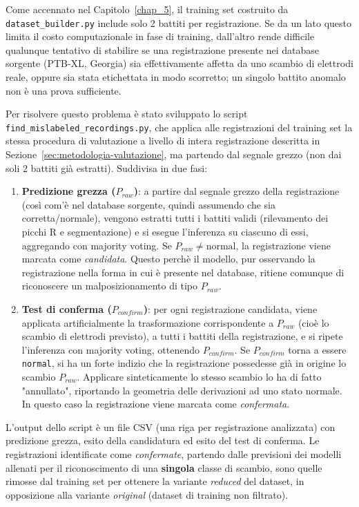Come accennato nel Capitolo~\ref{chap_5}, il training set costruito da \texttt{dataset\_builder.py} include solo 2 battiti per registrazione. Se da un lato questo limita il costo computazionale in fase di training, dall'altro rende difficile qualunque tentativo di stabilire se una registrazione presente nei database sorgente (PTB-XL, Georgia) sia effettivamente affetta da uno scambio di elettrodi reale, oppure sia stata etichettata in modo scorretto; un singolo battito anomalo non è una prova sufficiente.

Per risolvere questo problema è stato sviluppato lo script \\ \texttt{find\_mislabeled\_recordings.py}, che applica alle registrazioni del training set la stessa procedura di valutazione a livello di intera registrazione descritta in Sezione~\ref{sec:metodologia-valutazione}, ma partendo dal segnale grezzo (non dai soli 2 battiti già estratti). Suddivisa in due fasi:

\begin{enumerate}
	\item \textbf{Predizione grezza ($P_{raw}$)}: a partire dal segnale grezzo della registrazione (così com'è nel database sorgente, quindi assumendo che sia corretta/normale), vengono estratti tutti i battiti validi (rilevamento dei picchi R e segmentazione) e si esegue l'inferenza su ciascuno di essi, aggregando con majority voting. Se $P_{raw} \neq \text{normal}$, la registrazione viene marcata come \emph{candidata}. Questo perchè il modello, pur osservando la registrazione nella forma in cui è presente nel database, ritiene comunque di riconoscere un malposizionamento di tipo $P_{raw}$.
	\item \textbf{Test di conferma ($P_{confirm}$)}: per ogni registrazione candidata, viene applicata artificialmente la trasformazione corrispondente a $P_{raw}$ (cioè lo scambio di elettrodi previsto), a tutti i battiti della registrazione, e si ripete l'inferenza con majority voting, ottenendo $P_{confirm}$. Se $P_{confirm}$ torna a essere \texttt{normal}, si ha un forte indizio che la registrazione possedesse già in origine lo scambio $P_{raw}$. Applicare sinteticamente lo stesso scambio lo ha di fatto "annullato", riportando la geometria delle derivazioni ad uno stato normale. In questo caso la registrazione viene marcata come \emph{confermata}.
\end{enumerate}

L'output dello script è un file CSV (una riga per registrazione analizzata) con predizione grezza, esito della candidatura ed esito del test di conferma. Le registrazioni identificate come \emph{confermate}, partendo dalle previsioni dei modelli allenati per il riconoscimento di una \textbf{singola} classe di scambio, sono quelle rimosse dal training set per ottenere la variante \emph{reduced} del dataset, in opposizione alla variante \emph{original} (dataset di training non filtrato).

